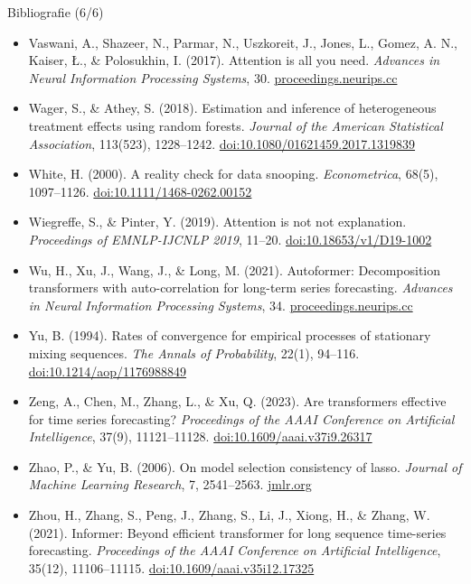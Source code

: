 \begin{frame}{Bibliografie (6/6)}
\itemsize{\tiny}
\begin{itemize}
    \item Vaswani, A., Shazeer, N., Parmar, N., Uszkoreit, J., Jones, L., Gomez, A. N., Kaiser, Ł., \& Polosukhin, I. (2017). Attention is all you need. \textit{Advances in Neural Information Processing Systems}, 30. \href{https://proceedings.neurips.cc/paper/2017/hash/3f5ee243547dee91fbd053c1c4a845aa-Abstract.html}{proceedings.neurips.cc}
    \item Wager, S., \& Athey, S. (2018). Estimation and inference of heterogeneous treatment effects using random forests. \textit{Journal of the American Statistical Association}, 113(523), 1228--1242. \href{https://doi.org/10.1080/01621459.2017.1319839}{doi:10.1080/01621459.2017.1319839}
    \item White, H. (2000). A reality check for data snooping. \textit{Econometrica}, 68(5), 1097--1126. \href{https://doi.org/10.1111/1468-0262.00152}{doi:10.1111/1468-0262.00152}
    \item Wiegreffe, S., \& Pinter, Y. (2019). Attention is not not explanation. \textit{Proceedings of EMNLP-IJCNLP 2019}, 11--20. \href{https://doi.org/10.18653/v1/D19-1002}{doi:10.18653/v1/D19-1002}
    \item Wu, H., Xu, J., Wang, J., \& Long, M. (2021). Autoformer: Decomposition transformers with auto-correlation for long-term series forecasting. \textit{Advances in Neural Information Processing Systems}, 34. \href{https://proceedings.neurips.cc/paper/2021/hash/bcc0d400288793e8bdcd7c19a8ac0c2b-Abstract.html}{proceedings.neurips.cc}
    \item Yu, B. (1994). Rates of convergence for empirical processes of stationary mixing sequences. \textit{The Annals of Probability}, 22(1), 94--116. \href{https://doi.org/10.1214/aop/1176988849}{doi:10.1214/aop/1176988849}
    \item Zeng, A., Chen, M., Zhang, L., \& Xu, Q. (2023). Are transformers effective for time series forecasting? \textit{Proceedings of the AAAI Conference on Artificial Intelligence}, 37(9), 11121--11128. \href{https://doi.org/10.1609/aaai.v37i9.26317}{doi:10.1609/aaai.v37i9.26317}
    \item Zhao, P., \& Yu, B. (2006). On model selection consistency of lasso. \textit{Journal of Machine Learning Research}, 7, 2541--2563. \href{https://jmlr.org/papers/v7/zhao06a.html}{jmlr.org}
    \item Zhou, H., Zhang, S., Peng, J., Zhang, S., Li, J., Xiong, H., \& Zhang, W. (2021). Informer: Beyond efficient transformer for long sequence time-series forecasting. \textit{Proceedings of the AAAI Conference on Artificial Intelligence}, 35(12), 11106--11115. \href{https://doi.org/10.1609/aaai.v35i12.17325}{doi:10.1609/aaai.v35i12.17325}

\end{itemize}
\end{frame}
